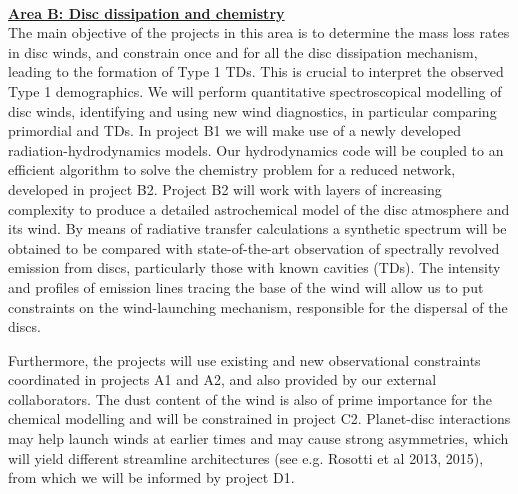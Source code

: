 \documentclass[12pt]{article}
\begin{document}
%



\
\mbox{}\vspace{1em}\\
\noindent\underline{\bf Area B: Disc dissipation and chemistry }\\

\noindent The main objective of the projects in this area is to
determine the mass loss rates in disc winds, and constrain once and
for all the disc dissipation mechanism, leading to the formation of
Type 1 TDs. This is crucial to interpret the observed Type 1
demographics. We will perform quantitative spectroscopical modelling
of disc winds, identifying and using new wind diagnostics, in
particular comparing primordial and TDs. In project B1 we will make
use of a newly developed radiation-hydrodynamics models. Our
hydrodynamics code will be coupled to an efficient 
algorithm to solve the chemistry problem for a reduced network,
developed in project B2. Project B2 will work with layers of
increasing complexity to produce a detailed astrochemical model of the
disc atmosphere and its wind. By means of radiative transfer
calculations a synthetic spectrum will be obtained to be compared with
state-of-the-art observation of spectrally revolved emission from
discs, particularly those with known cavities (TDs). The intensity and
profiles of emission lines tracing the base of the wind will allow us
to put constraints on the wind-launching mechanism, responsible for
the dispersal of the discs.  

Furthermore, the projects will use existing and new observational
constraints coordinated in projects A1 and A2, and also provided by
our external collaborators. The dust 
content of the wind is also of prime importance for the chemical
modelling and will be constrained in project C2. Planet-disc
interactions may help launch winds at earlier times and may cause
strong asymmetries, which will yield different streamline
architectures (see e.g. Rosotti et al 2013, 2015), from which we will
be informed by project D1.\\ 
\end{document}
